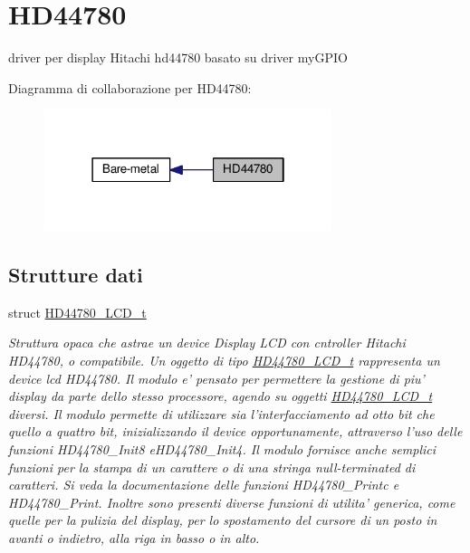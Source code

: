 \hypertarget{group___h_d44780}{\section{H\+D44780}
\label{group___h_d44780}
}


driver per display Hitachi hd44780 basato su driver my\+G\+P\+I\+O  


Diagramma di collaborazione per H\+D44780\+:\nopagebreak
\begin{figure}[H]
\begin{center}
\leavevmode
\includegraphics[width=238pt]{group___h_d44780}
\end{center}
\end{figure}
\subsection*{Strutture dati}
\begin{DoxyCompactItemize}
\item 
struct \hyperlink{struct_h_d44780___l_c_d__t}{H\+D44780\+\_\+\+L\+C\+D\+\_\+t}
\begin{DoxyCompactList}\small\item\em Struttura opaca che astrae un device Display L\+C\+D con cntroller Hitachi H\+D44780, o compatibile. Un oggetto di tipo \hyperlink{struct_h_d44780___l_c_d__t}{H\+D44780\+\_\+\+L\+C\+D\+\_\+t} rappresenta un device lcd H\+D44780. Il modulo e' pensato per permettere la gestione di piu' display da parte dello stesso processore, agendo su oggetti \hyperlink{struct_h_d44780___l_c_d__t}{H\+D44780\+\_\+\+L\+C\+D\+\_\+t} diversi. Il modulo permette di utilizzare sia l'interfacciamento ad otto bit che quello a quattro bit, inizializzando il device opportunamente, attraverso l'uso delle funzioni H\+D44780\+\_\+\+Init8 e\+H\+D44780\+\_\+\+Init4. Il modulo fornisce anche semplici funzioni per la stampa di un carattere o di una stringa null-\/terminated di caratteri. Si veda la documentazione delle funzioni H\+D44780\+\_\+\+Printc e H\+D44780\+\_\+\+Print. Inoltre sono presenti diverse funzioni di utilita' generica, come quelle per la pulizia del display, per lo spostamento del cursore di un posto in avanti o indietro, alla riga in basso o in alto. \end{DoxyCompactList}\end{DoxyCompactItemize}
